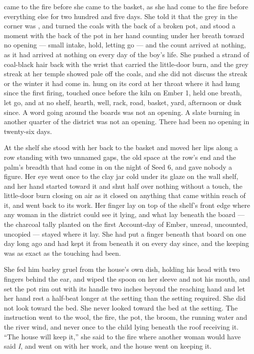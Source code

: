  came to the fire before she came to the basket, as she had come to the fire before everything else for two hundred and five days. She told it that the grey in the corner was , and turned the coals with the back of a broken pot, and stood a moment with the back of the pot in her hand counting under her breath toward no opening --- small intake, hold, letting go --- and the count arrived at nothing, as it had arrived at nothing on every day of the boy's life. She pushed a strand of coal-black hair back with the wrist that carried the little-door burn, and the grey streak at her temple showed pale off the coals, and she did not discuss the streak or the winter it had come in.  hung on its cord at her throat where it had hung since the first firing, touched once before the kiln on Ember 1, held one breath, let go, and at no shelf, hearth, well, rack, road, basket, yard, afternoon or dusk since. A word going around the boards was not an opening. A slate burning in another quarter of the district was not an opening. There had been no opening in twenty-six days.

At the shelf she stood with her back to the basket and moved her lips along a row standing with two unnamed gaps, the old space at the row's end and the palm's breadth that had come in on the night of Seed 6, and gave nobody a figure. Her eye went once to the clay jar cold under its glaze on the wall shelf, and her hand started toward it and shut half over nothing without a touch, the little-door burn closing on air as it closed on anything that came within reach of it, and went back to its work. Her finger lay on top of the shelf's front edge where any woman in the district could see it lying, and what lay beneath the board --- the charcoal tally planted on the first Account-day of Ember, unread, uncounted, uncopied --- stayed where it lay. She had put a finger beneath that board on one day long ago and had kept it from beneath it on every day since, and the keeping was as exact as the touching had been.

She fed him barley gruel from the house's own dish, holding his head with two fingers behind the ear, and wiped the spoon on her sleeve and not his mouth, and set the pot rim out with its handle two inches beyond the reaching hand and let her hand rest a half-beat longer at the setting than the setting required. She did not look toward the bed. She never looked toward the bed at the setting. The instruction went to the wool, the fire, the pot, the broom, the running water and the river wind, and never once to the child lying beneath the roof receiving it. “The house will keep it,” she said to the fire where another woman would have said \emph{I}, and went on with her work, and the house went on keeping it.

